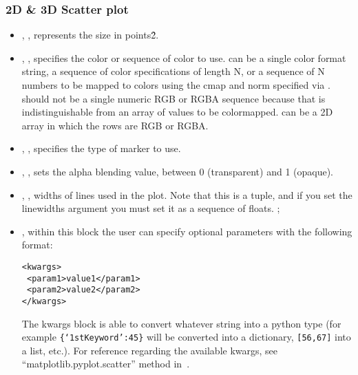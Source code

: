 \subsubsection{2D \& 3D Scatter plot}
  \begin{itemize}
    \item {}, , represents the size
    in points\^2. 
    \item {}, , specifies the color or
    sequence of color to use.
     can be a single color format string, a sequence of color
    specifications of length N, or a sequence of N numbers to be mapped to
    colors using the cmap and norm specified via .
    \nb {} should not be a single numeric RGB or RGBA sequence because
    that is indistinguishable from an array of values to be colormapped.
     can be a 2D array in which the rows are RGB or RGBA.
    \item {}, , specifies the type
    of marker to use.
    \item {}, , sets the alpha
    blending value, between 0 (transparent) and 1 (opaque).
    \item {}, , widths of
    lines used in the plot.
    Note that this is a tuple, and if you set the linewidths argument you must
    set it as a sequence of floats.
    ;
    \item {}, within this block the user can specify optional parameters
    with the following format:

\begin{lstlisting}[style=XML]
<kwargs>
 <param1>value1</param1>
 <param2>value2</param2>
</kwargs>
\end{lstlisting}

    The kwargs block is able to convert whatever string into a python type (for
    example \texttt{\{`1stKeyword':45\}} will
    be converted into a dictionary, 
    \texttt{[56,67]} into a list, etc.).
    For reference regarding the available kwargs, see
    ``matplotlib.pyplot.scatter'' method in~\cite{MatPlotLib}.
  \end{itemize}

